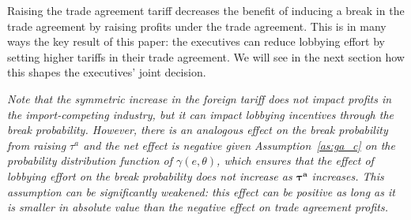 \documentclass[10pt]{article}
\newcommand{\ta}{\theta}
\newcommand{\bta}{\bm{\tau^a}}
\newcommand{\ga}{\gamma}
\begin{document}
\noindent Raising the trade agreement tariff decreases the benefit of inducing a break in the trade agreement by raising profits under the trade agreement. This is in many ways the key result of this paper: the executives can reduce lobbying effort by setting higher tariffs in their trade agreement. We will see in the next section how this shapes the executives' joint decision. 

\textit{Note that the symmetric increase in the foreign tariff does not impact profits in the import-competing industry, but it can impact lobbying incentives through the break probability. However, there is an analogous effect on the break probability from raising $\tau^a$ and the net effect is negative given Assumption~\ref{as:ga_c} on the probability distribution function of $\ga(e,\ta)$, which ensures that the effect of lobbying effort on the break probability does not increase as $\bta$ increases. This assumption can be significantly weakened: this effect can be positive as long as it is smaller in absolute value than the negative effect on trade agreement profits.}
\end{document}
